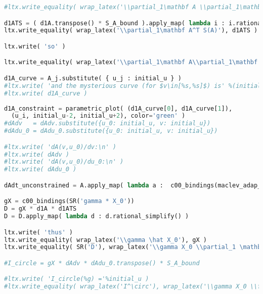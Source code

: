 \begin{lstlisting}[language=Python]
#ltx.write_equality( wrap_latex('\\partial_1\mathbf A \\partial_1\mathbf A^T'), (dAdv * dAdv.transpose()) )

d1ATS = ( d1A.transpose() * S_A_bound ).apply_map( lambda i : i.rational_simplify() )
ltx.write_equality( wrap_latex('\\partial_1\mathbf A^T S(A)'), d1ATS )

ltx.write( 'so' )

ltx.write_equality( wrap_latex('\\partial_1\mathbf A\\partial_1\mathbf A^T S(\mathbf A)'), d1A * d1ATS )

d1A_curve = A_j.substitute( { u_j : initial_u } )
#ltx.write( 'and the mysterious curve (for $v\in[%s,%s]$) is' %(initial_u-2,initial_u+2) )
#ltx.write( d1A_curve )
 
d1A_constraint = parametric_plot( (d1A_curve[0], d1A_curve[1]),
  (u_i, initial_u-2, initial_u+2), color='green' )
#dAdv   = dAdv.substitute({u_0: initial_u, v: initial_u})
#dAdu_0 = dAdu_0.substitute({u_0: initial_u, v: initial_u})

#ltx.write( 'dA(v,u_0)/dv:\n' )
#ltx.write( dAdv )
#ltx.write( 'dA(v,u_0)/du_0:\n' )
#ltx.write( dAdu_0 )

dAdt_unconstrained = A.apply_map( lambda a :  c00_bindings(maclev_adap_lv._flow[a].substitute({SR.var('a_0_0'):A_0[0][0], SR.var('k_0'):A_0[1][0]})) )

gX = c00_bindings(SR('gamma * X_0'))
D = gX * d1A * d1ATS
D = D.apply_map( lambda d : d.rational_simplify() )

ltx.write( 'thus' )
ltx.write_equality( wrap_latex('\\gamma \hat X_0'), gX )
ltx.write_equality( SR('D'), wrap_latex('\\gamma X_0 \\partial_1 \mathbf A \\partial_1 \mathbf A^T S(\mathbf A)'), D )

#I_circle = gX * dAdv * dAdu_0.transpose() * S_A_bound

#ltx.write( 'I_circle(%g) ='%initial_u )
#ltx.write_equality( wrap_latex('I^\circ'), wrap_latex('\\gamma X_0 \\frac{\\partial A}{\\partial v}\\frac{\\partial A}{\\partial u_0}^T S(A)'), I_circle )


\end{lstlisting}
